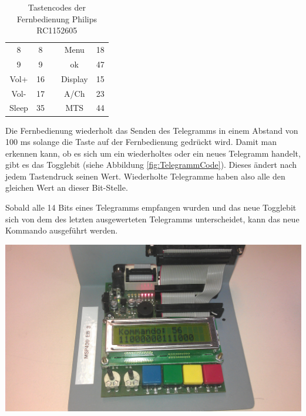 \documentclass[12pt,a4paper,bibliography=totocnumbered,listof=totocnumbered]{scrartcl}
\begin{document}
\begin{table}[h]
\begin{tabular}{|c|c|c|c|c|}
		\cellcolor[gray]{.8}8                        & 8                   &                       & \cellcolor[gray]{.8}Menu          & 18                  \\ \cline{1-2} \cline{4-5} 
		\cellcolor[gray]{.8}9                        & 9                   &                       & \cellcolor[gray]{.8}ok            & 47                  \\ \cline{1-2} \cline{4-5} 
		\cellcolor[gray]{.8}Vol+                     & 16                  &                       & \cellcolor[gray]{.8}Display       & 15                  \\ \cline{1-2} \cline{4-5}
		\cellcolor[gray]{.8}Vol-                     & 17                  &                       & \cellcolor[gray]{.8}A/Ch	       & 23                  \\ \cline{1-2} \cline{4-5}  
		\cellcolor[gray]{.8}Sleep                    & 35                  & \multicolumn{1}{l|}{} & \cellcolor[gray]{.8}MTS           & 44                  \\ \cline{1-2} \cline{4-5} 
	\end{tabular}
	\caption{Tastencodes der Fernbedienung Philips RC1152605}
	\label{TastencodeTabelle}
\end{table}

Die Fernbedienung wiederholt das Senden des Telegramms in einem Abstand von 100 ms solange die Taste auf der Fernbedienung gedrückt wird. Damit man erkennen kann, ob es sich um ein wiederholtes oder ein neues Telegramm handelt, gibt es das Togglebit (siehe Abbildung \ref{fig:TelegrammCode}). Dieses ändert nach jedem Tastendruck seinen Wert. Wiederholte Telegramme haben also alle den gleichen Wert an dieser Bit-Stelle.

Sobald alle 14 Bits eines Telegramms empfangen wurden und das neue Togglebit sich von dem des letzten ausgewerteten Telegramms unterscheidet, kann das neue Kommando ausgeführt werden.

\vspace{1em}
\begin{minipage}{\linewidth}
	\centering
	\includegraphics[width=0.7\linewidth]{img/Fernbedienung2.jpg}
	\label{fig:Kommando}
\end{minipage}
\end{document}
